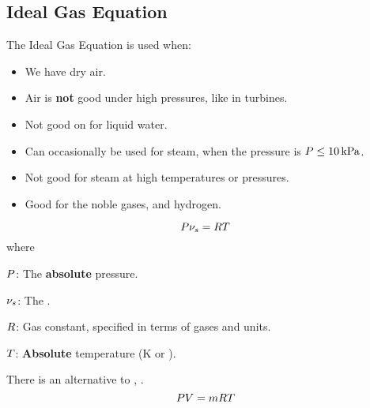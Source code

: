 \subsection{Ideal Gas Equation}\label{subsec:Ideal_Gas_Equation}
The Ideal Gas Equation is used when:
\begin{itemize}[noitemsep]
\item We have dry air.
\item Air is \textbf{not} good under high pressures, like in turbines.
\item Not good on for liquid water.
\item Can occasionally be used for steam, when the pressure is $P \leq \SI{10}{\kilo\pascal}$.
\item Not good for steam at high temperatures or pressures.
\item Good for the noble gases, and hydrogen.
\end{itemize}

\begin{equation}\label{eq:Ideal_Gas_Equation}
  P \nu_{s} = R T
\end{equation}
where
\begin{description}[noitemsep]
\item $P$: The \textbf{absolute} pressure.
\item $\nu_{s}$: The .
\item $R$: Gas constant, specified in terms of gases and units.
\item $T$: \textbf{Absolute} temperature (\si{\kelvin} or \si{\rankine}).
\end{description}

There is an alternative to , .
\begin{equation}\label{eq:Ideal_Gas_Equation-Mass}
  P V = m R T
\end{equation}

